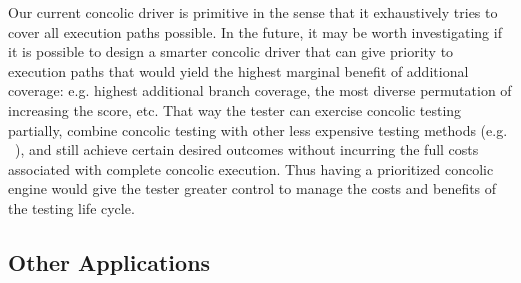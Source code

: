 Our current concolic driver is primitive in the sense that it exhaustively tries to cover all execution paths possible.  
In the future, it may be worth investigating if it is possible to design a smarter concolic driver that can give priority to execution paths that would yield the highest marginal benefit of additional coverage: 
e.g. highest additional branch coverage, the most diverse permutation of increasing the score, etc.  
That way the tester can exercise concolic testing partially, combine concolic testing with other less expensive testing methods (e.g. ~\cite{feedbackConcolic, hybridconcolic}), and still achieve certain desired outcomes without incurring the full costs associated with complete concolic execution.  
Thus having a prioritized concolic engine would give the tester greater control to manage the costs and benefits of the testing life cycle.  

\subsection{Other Applications}

